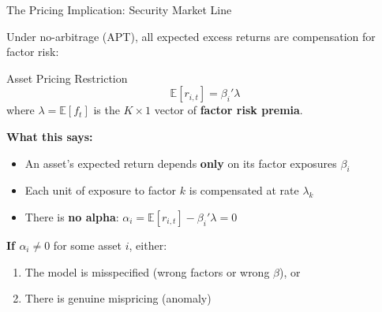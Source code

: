 \documentclass[aspectratio=169]{beamer}
\newcommand{\E}{\mathbb{E}}
\begin{document}
\begin{frame}{The Pricing Implication: Security Market Line}

Under no-arbitrage (APT), all expected excess returns are compensation for factor risk:

\begin{block}{Asset Pricing Restriction}
\vspace{-0.5em}
\[
\E[r_{i,t}] = \beta_i' \lambda
\]
where $\lambda = \E[f_t]$ is the $K \times 1$ vector of \textbf{factor risk premia}.
\end{block}

\vspace{0.3em}
\textbf{What this says:}
\begin{itemize}
    \item An asset's expected return depends \textbf{only} on its factor exposures $\beta_i$
    \item Each unit of exposure to factor $k$ is compensated at rate $\lambda_k$
    \item There is \textbf{no alpha}: $\alpha_i = \E[r_{i,t}] - \beta_i'\lambda = 0$
\end{itemize}

\vspace{0.5em}
\textbf{If $\alpha_i \neq 0$} for some asset $i$, either:
\begin{enumerate}
    \item The model is misspecified (wrong factors or wrong $\beta$), or
    \item There is genuine mispricing (anomaly)
\end{enumerate}
\end{frame}
%
%
\end{document}
